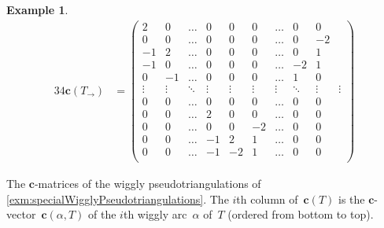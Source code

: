 \documentclass{amsart}
\theoremstyle{definition}
\newtheorem{example}[theorem]{Example}
\renewcommand{\b}[1]{{\boldsymbol{#1}}} %
\begin{document}
\begin{example}
\begin{table}
\begin{alignat*}{3}
	4\b{c}(T_\rightarrow) & = \begin{pmatrix}
		2 & 0 & \dots & 0 & 0 & 0 & \dots & 0 & 0 \\
		0 & 0 & \dots & 0 & 0 & 0 & \dots & 0 & -2 \\
		-1 & 2 & \dots & 0 & 0 & 0 & \dots & 0 & 1 \\
		-1 & 0 & \dots & 0 & 0 & 0 & \dots & -2 & 1 \\
		0 & -1 & \dots & 0 & 0 & 0 & \dots & 1 & 0 \\
		\vdots & \vdots & \ddots & \vdots & \vdots & \vdots & \vdots & \ddots & \vdots & \vdots \\
		0 & 0 & \dots & 0 & 0 & 0 & \dots & 0 & 0 \\
		0 & 0 & \dots & 2 & 0 & 0 & \dots & 0 & 0 \\
		0 & 0 & \dots & 0 & 0 & -2 & \dots & 0 & 0 \\
		0 & 0 & \dots & -1 & 2 & 1 & \dots & 0 & 0 \\
		0 & 0 & \dots & -1 & -2 & 1 & \dots & 0 & 0 \\
	\end{pmatrix}
	\end{alignat*}
	\endgroup
	\caption{The $\b{c}$-matrices of the wiggly pseudotriangulations of \cref{exm:specialWigglyPseudotriangulations}. The $i$th column of~$\b{c}(T)$ is the $\b{c}$-vector~$\b{c}(\alpha, T)$ of the $i$th wiggly arc~$\alpha$ of~$T$ (ordered from bottom to top).}
	\label{table:specialCMatrices}
\end{table}
\end{example}
\end{document}
